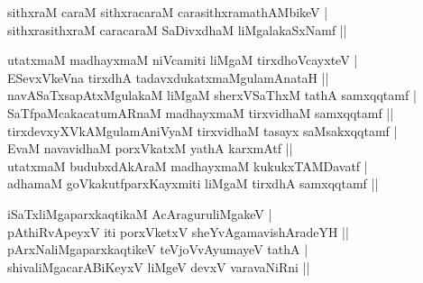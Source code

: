 \begin{entry}
\begin{shl}
sithxraM caraM sithxracaraM carasithxramathAMbikeV |\\[2pt]
sithxrasithxraM caracaraM SaDivxdhaM liMgalakaSxNamf ||\\[-1pt]
\end{shl}
\medskip
{}
\vskip 5pt
\smallskip
\begin{shl}
utatxmaM madhayxmaM niVcamiti liMgaM tirxdhoVcayxteV |\\[2pt]
ESevxVkeVna tirxdhA tadavxdukatxmaMgulamAnataH ||\\[2pt]
navASaTxsapAtxMgulakaM liMgaM sherxVSaThxM tathA samxqqtamf |\\[2pt]
SaTfpaMcakacatumARnaM madhayxmaM tirxvidhaM samxqqtamf ||\\[2pt]
tirxdevxyXVkAMgulamAniVyaM tirxvidhaM tasayx saMsakxqqtamf |\\[2pt]
EvaM navavidhaM porxVkatxM yathA karxmAtf ||\\[2pt]
utatxmaM budubxdAkAraM madhayxmaM kukukxTAMDavatf |\\[2pt]
adhamaM goVkakutfparxKayxmiti liMgaM tirxdhA samxqqtamf ||\\[-1pt]
\end{shl}
\medskip
{}
\smallskip
{}
\smallskip
\begin{shl}
iSaTxliMgaparxkaqtikaM AcAraguruliMgakeV |\\[2pt]
pAthiRvApeyxV iti porxVketxV sheYvAgamavishAradeYH ||\\[2pt]
pArxNaliMgaparxkaqtikeV teVjoVvAyumayeV tathA |\\[2pt]
shivaliMgacarABiKeyxV liMgeV devxV varavaNiRni ||\\[2pt]

\end{shl}
\end{entry}
